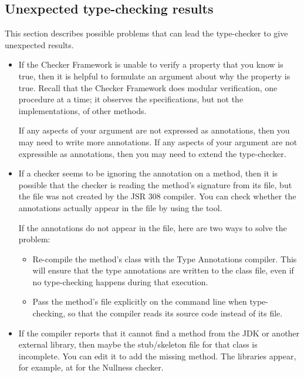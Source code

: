 \subsection{Unexpected type-checking results\label{common-problems-typechecking}}

This section describes possible problems that can lead the type-checker to
give unexpected results.


\begin{itemize}
\item
  If the Checker Framework is unable to verify a property that you know is
  true, then it is helpful to formulate an argument about why the property
  is true.  Recall that the Checker Framework does modular verification,
  one procedure at a time; it observes the specifications, but not the
  implementations, of other methods.

  If any aspects of your argument are not expressed as annotations, then
  you may need to write more annotations.  If any aspects of your argument
  are not expressible as annotations, then you may need to extend the
  type-checker.

\item
If a checker seems to be ignoring the annotation on a method, then it is
possible that the checker is reading the method's signature from its
 file, but the  file was not created by the JSR
308 compiler.  You can check whether the annotations actually appear in the
 file by using the  tool.

If the annotations do not appear in the  file, here are two
ways to solve the problem:
\begin{itemize}
\item
  Re-compile the method's class with the Type Annotations compiler.  This will
  ensure that the type annotations are written to the class file, even if
  no type-checking happens during that execution.
\item
  Pass the method's file explicitly on the command line when type-checking,
  so that the compiler reads its source code instead of its 
  file.
\end{itemize}

\item
If the compiler reports that it cannot find a method from the
JDK or another external library, then maybe the stub/skeleton file for that
class is incomplete.  You can edit it to add the missing method.  The
libraries appear, for example, at  for the
Nullness checker.


\end{itemize}
